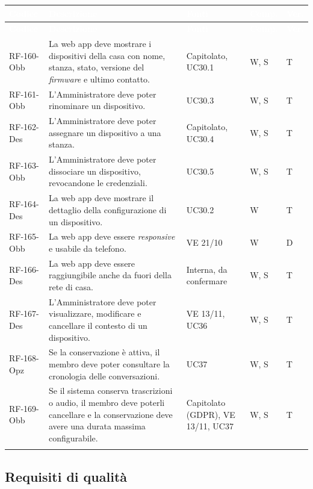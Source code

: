 \documentclass[12pt,a4paper]{article}
\newcommand{\thc}[1]{\textcolor{white}{\textbf{#1}}}
\newcommand{\rl}{\\ \arrayrulecolor{bfline}\hline}
\begin{document}
\begin{longtable}{>{\raggedright\arraybackslash}p{}>{\raggedright\arraybackslash}p{}>{\raggedright\arraybackslash}p{}>{\raggedright\arraybackslash}p{}>{\centering\arraybackslash}p{}}
\rowcolor{bfblue}\thc{Codice} & \thc{Descrizione} & \thc{Fonti} & \thc{Comp.} & \thc{Ver.} \\
\endfirsthead
\rowcolor{bfblue}\thc{Codice} & \thc{Descrizione} & \thc{Fonti} & \thc{Comp.} & \thc{Ver.} \\
\endhead
RF-160-Obb & La web app deve mostrare i dispositivi della casa con nome, stanza, stato, versione del \emph{firmware} e ultimo contatto. & Capitolato, UC30.1 & W, S & T \rl
RF-161-Obb & L'Amministratore deve poter rinominare un dispositivo. & UC30.3 & W, S & T \rl
RF-162-Des & L'Amministratore deve poter assegnare un dispositivo a una stanza. & Capitolato, UC30.4 & W, S & T \rl
RF-163-Obb & L'Amministratore deve poter dissociare un dispositivo, revocandone le credenziali. & UC30.5 & W, S & T \rl
RF-164-Des & La web app deve mostrare il dettaglio della configurazione di un dispositivo. & UC30.2 & W & T \rl
RF-165-Obb & La web app deve essere \emph{responsive} e usabile da telefono. & VE 21/10 & W & D \rl
RF-166-Des & La web app deve essere raggiungibile anche da fuori della rete di casa. & Interna, da confermare & W, S & T \rl
RF-167-Des & L'Amministratore deve poter visualizzare, modificare e cancellare il contesto di un dispositivo. & VE 13/11, UC36 & W, S & T \rl
RF-168-Opz & Se la conservazione è attiva, il membro deve poter consultare la cronologia delle conversazioni. & UC37 & W, S & T \rl
RF-169-Obb & Se il sistema conserva trascrizioni o audio, il membro deve poterli cancellare e la conservazione deve avere una durata massima configurabile. & Capitolato (GDPR), VE 13/11, UC37 & W, S & T \rl
\end{longtable}

\subsection{Requisiti di qualità}
\end{document}
